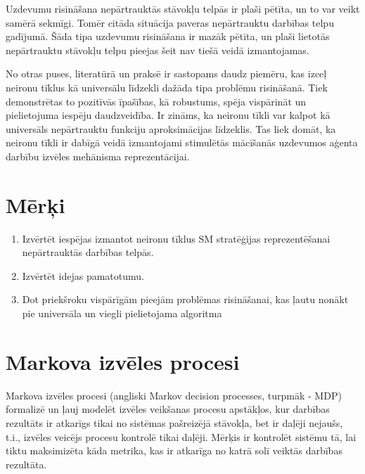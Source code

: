 \documentclass[a0,landscape]{a0poster}
\numberwithin{equation}{section}
\theoremstyle{definition}
\theoremstyle{plain}
\begin{document}
\begin{multicols}{4}
Uzdevumu risināšana nepārtrauktās stāvokļu telpās ir plaši pētīta, un to var veikt samērā sekmīgi.
Tomēr citāda situācija paveras nepārtrauktu darbības telpu gadījumā.
Šāda tipa uzdevumu risināšana ir mazāk pētīta, un plaši lietotās nepārtrauktu stāvokļu telpu pieejas šeit nav tiešā veidā izmantojamas.

No otras puses, literatūrā un praksē ir sastopams daudz piemēru, kas izceļ neironu tīklus kā universālu līdzekli dažāda tipa problēmu risināšanā.
Tiek demonstrētas to pozitīvās īpašības, kā robustums, spēja vispārināt un pielietojuma iespēju daudzveidība.
Ir zināms, ka neironu tīkli var kalpot kā universāls nepārtrauktu funkciju aproksimācijas līdzeklis.
Tas liek domāt, ka neironu tīkli ir dabīgā veidā izmantojami stimulētās mācīšanās uzdevumos aģenta darbību izvēles mehānisma reprezentācijai.



\color{DarkSlateGray} %

\section*{Mērķi}
\begin{enumerate}
	\item Izvērtēt iespējas izmantot neironu tīklus SM stratēģijas reprezentēšanai nepārtrauktās darbības telpās.
	\item Izvērtēt idejas pamatotumu.
	\item Dot priekšroku vispārīgām pieejām problēmas risināšanai, kas ļautu nonākt pie universāla un viegli pielietojama algoritma
\end{enumerate}


\section*{Markova izvēles procesi}

Markova izvēles procesi (angliski Markov decision processes, turpmāk - MDP) formalizē un ļauj modelēt izvēles veikšanas procesu apstākļos, kur darbības rezultāts ir atkarīgs tikai no sistēmas pašreizējā stāvokļa, bet ir daļēji nejaušs, t.i., izvēles veicējs procesu kontrolē tikai daļēji.
Mērķis ir kontrolēt sistēmu tā, lai tiktu maksimizēta kāda metrika, kas ir atkarīga no katrā solī veiktās darbības rezultāta.


\end{multicols}
\end{document}
